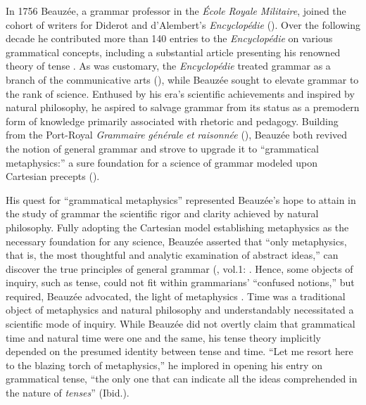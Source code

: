 \documentclass[output=paper]{langsci/langscibook}
\begin{document}
 In 1756 Beauzée, a grammar professor in the \textit{École} \textit{Royale} \textit{Militaire}, joined the cohort of writers for Diderot and d’Alembert’s \textit{Encyclopédie} (\citealt{le_guern_nicolas_2009}). Over the following decade he contributed more than 140 entries to the \textit{Encyclopédie} on various grammatical concepts, including a substantial article presenting his renowned theory of tense \citep{beauzee_tems_1765}. As was customary, the \textit{Encyclopédie} treated grammar as a branch of the communicative arts (\citealt{dalembert_systeme_1751}), while Beauzée sought to elevate grammar to the rank of science. Enthused by his era’s scientific achievements and inspired by natural philosophy, he aspired to salvage grammar from its status as a premodern form of knowledge primarily associated with rhetoric and pedagogy. Building from the Port\nobreakdash-Royal \textit{Grammaire} \textit{générale} \textit{et} \textit{raisonnée} (\citealt{arnauld_grammaire_1660}), Beauzée both revived the notion of general grammar and strove to upgrade it to “grammatical metaphysics:” a sure foundation for a science of grammar modeled upon Cartesian precepts (\citealt{chalozin-dovrat_grammar_2019}).
 
 His quest for “grammatical metaphysics” represented Beauzée’s hope to attain in the study of grammar the scientific rigor and clarity achieved by natural philosophy. Fully adopting the Cartesian model establishing metaphysics as the necessary foundation for any science, Beauzée asserted that “only metaphysics, that is, the most thoughtful and analytic examination of abstract ideas,” can discover the true principles of general grammar (\citealt{beauzee_grammaire_1767}, vol.1: . Hence, some objects of inquiry, such as tense, could not fit within grammarians’ “confused notions,” but required, Beauzée advocated, the light of metaphysics \citep[96]{beauzee_grammaire_1767}. Time was a traditional object of metaphysics and natural philosophy and understandably necessitated a scientific mode of inquiry. While Beauzée did not overtly claim that grammatical time and natural time were one and the same, his tense theory implicitly depended on the presumed identity between tense and time. “Let me resort here to the blazing torch of metaphysics,” he implored in opening his entry on grammatical tense, “the only one that can indicate all the ideas comprehended in the nature of \textit{tenses}” (Ibid.).
 
\end{document}

